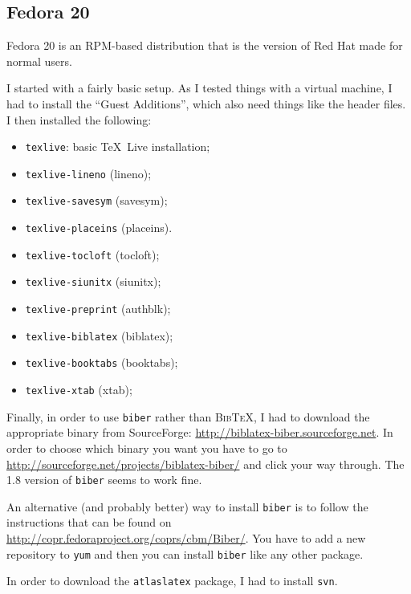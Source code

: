 \documentclass[UKenglish]{latex/atlasdoc}
\newcommand{\BibTeX}{\textsc{Bib\TeX}}
\newcommand{\Package}[1]{\texttt{#1}\xspace}
\begin{document}
\subsection{Fedora 20} 

Fedora 20 is an RPM-based distribution that is the version of Red Hat made for normal users.

I started with a fairly basic setup.
As I tested things with a virtual machine, I had to install the \enquote{Guest Additions},
which also need things like the header files.
I then installed the following:
\begin{itemize}\setlength{\parskip}{0pt}\setlength{\itemsep}{0pt}
\item \Package{texlive}: basic \TeX\ Live installation;
\item \Package{texlive-lineno} (lineno);
\item \Package{texlive-savesym} (savesym);
\item \Package{texlive-placeins} (placeins).
\item \Package{texlive-tocloft} (tocloft);
\item \Package{texlive-siunitx} (siunitx);
\item \Package{texlive-preprint} (authblk);
\item \Package{texlive-biblatex} (biblatex);
\item \Package{texlive-booktabs} (booktabs);
\item \Package{texlive-xtab} (xtab);
\end{itemize}

Finally, in order to use \Package{biber} rather than \BibTeX,
I had to download the appropriate binary from SourceForge:
\url{http://biblatex-biber.sourceforge.net}.
In order to choose which binary you want you have to go to
\url{http://sourceforge.net/projects/biblatex-biber/} and click your way through.
The 1.8 version of \Package{biber} seems to work fine.

An alternative (and probably better) way to install \Package{biber} is to follow the
instructions that can be found on
\url{http://copr.fedoraproject.org/coprs/cbm/Biber/}.
You have to add a new repository to \Package{yum} and then you
can install \Package{biber} like any other package.

In order to download the \Package{atlaslatex} package, I had to install \Package{svn}.


\end{document}
